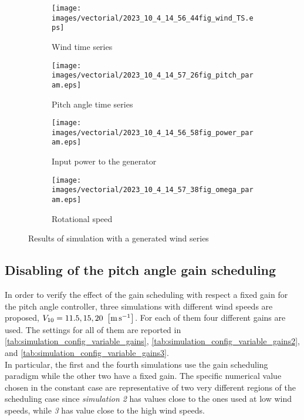 \begin{figure}[htb]
  \begin{subfigure}{0.49\columnwidth}
    \centering
    \texttt{[image: images/vectorial/2023\_10\_4\_14\_56\_44fig\_wind\_TS.eps]}
    \caption{Wind time series}
    \label{fig:2023_05_1_00_55_48fig_wind_TS.eps}
  \end{subfigure}
  \begin{subfigure}{0.49\columnwidth}
    \centering
    \texttt{[image: images/vectorial/2023\_10\_4\_14\_57\_26fig\_pitch\_param.eps]}
    \caption{Pitch angle time series}
    \label{fig:2023_05_1_00_50_19fig_power_param}
  \end{subfigure}
  \begin{subfigure}{0.49\columnwidth}
    \centering
    \texttt{[image: images/vectorial/2023\_10\_4\_14\_56\_58fig\_power\_param.eps]}
    \caption{Input power to the generator}
    \label{fig:2023_05_1_00_51_17fig_omega_param}
  \end{subfigure}
  \begin{subfigure}{0.49\columnwidth}
    \centering
    \texttt{[image: images/vectorial/2023\_10\_4\_14\_57\_38fig\_omega\_param.eps]}
    \caption{Rotational speed}
    \label{fig:2023_05_1_00_50_58fig_pitch_param}
  \end{subfigure}
  \caption{Results of simulation with a generated wind series}
  \label{fig:simulation_rand_wind_NPC}
\end{figure}

\subsection{Disabling of the pitch angle gain scheduling}\label{subsec:gain_scheduling_disabling}
In order to verify the effect of the gain scheduling with respect a fixed gain for the pitch angle controller, three simulations with different wind speeds are proposed, $V_{10} = 11.5, 15, 20 \ \left[\si{\meter\per\second}\right]$. For each of them four different gains are used. The settings for all of them are reported in \autoref{tab:simulation_config_variable_gains}, \autoref{tab:simulation_config_variable_gains2}, and \autoref{tab:simulation_config_variable_gains3}. \\
In particular, the first and the fourth simulations use the gain scheduling paradigm while the other two have a fixed gain. The specific numerical value chosen in the constant case are representative of two very different regions of the scheduling case since \textit{simulation 2} has values close to the ones used at low wind speeds, while \textit{3} has value close to the high wind speeds. 

